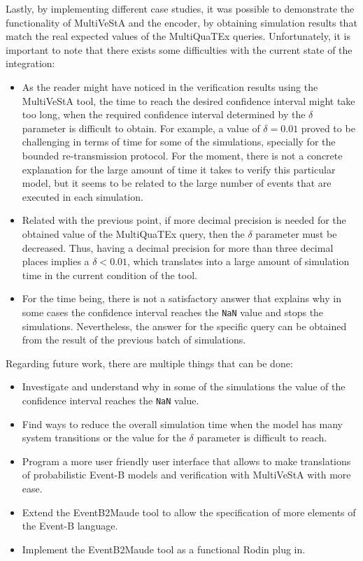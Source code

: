 Lastly, by implementing different case studies, it was possible to demonstrate the functionality of MultiVeStA and the encoder, by obtaining simulation results that match the real expected values of the MultiQuaTEx queries. Unfortunately, it is important to note that there exists some difficulties with the current state of the integration:
\begin{itemize}
    \item As the reader might have noticed in the verification results using the MultiVeStA tool, the time to reach the desired confidence interval might take too long, when the required confidence interval determined by the $\delta$ parameter is difficult to obtain. For example, a value of $\delta = 0.01$ proved to be challenging in terms of time for some of the simulations, specially for the bounded re-transmission protocol. For the moment, there is not a concrete explanation for the large amount of time it takes to verify this particular model, but it seems to be related to the large number of events that are executed in each simulation.
    
    \item Related with the previous point, if more decimal precision is needed for the obtained value of the MultiQuaTEx query, then the $\delta$ parameter must be decreased. Thus, having a decimal precision for more than three decimal places implies a $\delta < 0.01$, which translates into a large amount of simulation time in the current condition of the tool.

    \item For the time being, there is not a satisfactory answer that explains why in some cases the confidence interval reaches the \texttt{NaN} value and stops the simulations. Nevertheless, the answer for the specific query can be obtained from the result of the previous batch of simulations.
\end{itemize}

Regarding future work, there are multiple things that can be done:
\begin{itemize}
    \item Investigate and understand why in some of the simulations the value of the confidence interval reaches the \texttt{NaN} value.
    \item Find ways to reduce the overall simulation time when the model has many system transitions or the value for the $\delta$ parameter is difficult to reach.
    \item Program a more user friendly user interface that allows to make translations of probabilistic Event-B models and verification with MultiVeStA with more ease.
    \item Extend the EventB2Maude tool to allow the specification of more elements of the Event-B language.
    \item Implement the EventB2Maude tool as a functional Rodin plug in.
\end{itemize}